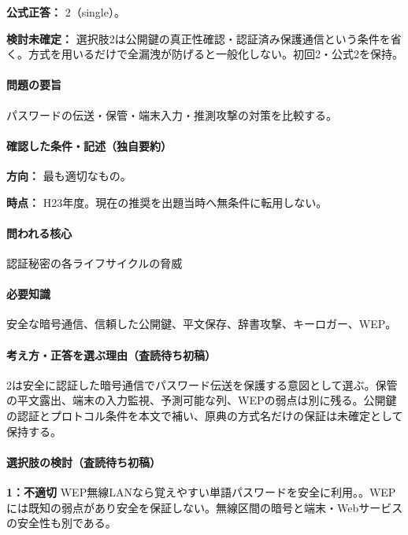 \textbf{公式正答：} 2（single）。

\par\textbf{検討未確定：} 選択肢2は公開鍵の真正性確認・認証済み保護通信という条件を省く。方式を用いるだけで全漏洩が防げると一般化しない。初回2・公式2を保持。

\paragraph{問題の要旨} パスワードの伝送・保管・端末入力・推測攻撃の対策を比較する。

\paragraph{確認した条件・記述（独自要約）}\mbox{}\par

\noindent\textbf{方向：} 最も適切なもの。\par

\noindent\textbf{時点：} H23年度。現在の推奨を出題当時へ無条件に転用しない。\par

\paragraph{問われる核心} 認証秘密の各ライフサイクルの脅威

\paragraph{必要知識} 安全な暗号通信、信頼した公開鍵、平文保存、辞書攻撃、キーロガー、WEP。

\paragraph{考え方・正答を選ぶ理由（査読待ち初稿）} 2は安全に認証した暗号通信でパスワード伝送を保護する意図として選ぶ。保管の平文露出、端末の入力監視、予測可能な列、WEPの弱点は別に残る。公開鍵の認証とプロトコル条件を本文で補い、原典の方式名だけの保証は未確定として保持する。

\paragraph{選択肢の検討（査読待ち初稿）}\mbox{}\par

\noindent\textbf{1：不適切} WEP無線LANなら覚えやすい単語パスワードを安全に利用。。WEPには既知の弱点があり安全を保証しない。無線区間の暗号と端末・Webサービスの安全性も別である。\par

